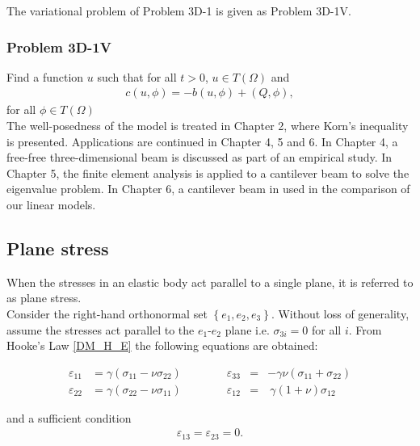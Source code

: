 \documentclass[../../main.tex]{subfiles}
\begin{document}
The variational problem of Problem 3D-1 is given as Problem 3D-1V.

\subsubsection{Problem 3D-1V}\label{sssec:3D_Model:Problem3D1V}
Find a function $u$ such that for all $t>0$, $u \in T(\Omega)$ and
\begin{align}
	c(u,\phi) = -b(u,\phi) + (Q,\phi), \label{eq:3D_Model:Problem3D1VEq}
\end{align}\label{sym:c}
for all $\phi \in T(\Omega)$\\

The well-posedness of the model is treated in Chapter 2, where Korn's
inequality is presented. Applications are continued in Chapter 4, 5 and 6. In
Chapter 4, a free-free three-dimensional beam is discussed as part of an
empirical study. In Chapter 5, the finite element analysis is applied to a
cantilever beam to solve the eigenvalue problem. In Chapter 6, a cantilever
beam in used in the comparison of our linear models.

\subsection{Plane stress}\label{ssec:3D_Model:PlaneStress}
When the stresses in an elastic body act parallel to a single plane, it is
referred to as plane stress.\\

Consider the right-hand orthonormal set $\left\{e_1, e_2, e_3\right\}$. Without
loss of generality, assume the stresses act parallel to the $e_1$-$e_2$ plane
i.e. $\sigma_{3i} = 0$ for all $i$. From Hooke's Law \eqref{DM_H_E} the
following equations are obtained:

\begin{equation}
	\begin{aligned}
		\varepsilon_{11} & =  \gamma  ( \sigma_{11} - \nu \sigma_{22}) \qquad \qquad \varepsilon_{33} & = & - \gamma \nu (\sigma_{11} + \sigma_{22})          \\
		\varepsilon_{22} & =   \gamma (\sigma_{22} - \nu\sigma_{11}) \qquad \qquad \varepsilon_{12}   & = & \  \gamma (1+\nu) \sigma_{12} \label{strain_comp}
	\end{aligned}
\end{equation}

and a sufficient condition
\begin{eqnarray}
	\varepsilon_{13} =  \varepsilon_{23} = 0.
\end{eqnarray}
\end{document}

